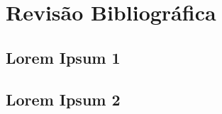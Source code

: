 \chapter[Revisão Bibliográfica]{Revisão Bibliográfica}

\section{Lorem Ipsum 1}

\lipsum[1-4]

\section{Lorem Ipsum 2}

\lipsum[1-4]
